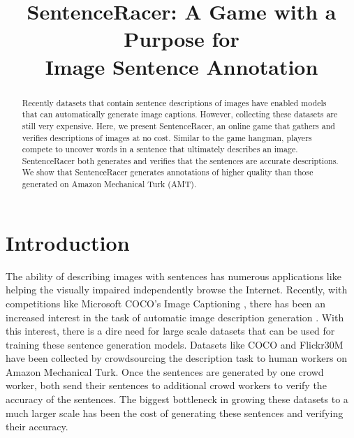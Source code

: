 \documentclass[preprint]{sigchi}
\begin{document}
\title{SentenceRacer: A Game with a Purpose for \\ Image Sentence Annotation}

\author{
}

\maketitle
\begin{abstract}
Recently datasets that contain sentence descriptions of images have enabled models that can automatically generate image captions. However, collecting these datasets are still very expensive. Here, we present SentenceRacer, an online game that gathers and verifies descriptions of images at no cost. Similar to the game hangman, players compete to uncover words in a sentence that ultimately describes an image. SentenceRacer both generates and verifies that the sentences are accurate descriptions. We show that SentenceRacer generates annotations of higher quality than those generated on Amazon Mechanical Turk (AMT). \end{abstract}








\section{Introduction}
The ability of describing images with sentences has numerous applications like helping the visually impaired independently browse the Internet. Recently, with competitions like Microsoft COCO's Image Captioning \cite{coco}, there has been an increased interest in the task of automatic image description generation \cite{google}. With this interest, there is a dire need for large scale datasets that can be used for training these sentence generation models. Datasets like COCO \cite{coco} and Flickr30M \cite{flickr} have been collected by crowdsourcing the description task to human workers on Amazon Mechanical Turk. Once the sentences are generated by one crowd worker, both \cite{coco, flickr} send their sentences to additional crowd workers to verify the accuracy of the sentences. The biggest bottleneck in growing these datasets to a much larger scale has been the cost of generating these sentences and verifying their accuracy. 
\end{document}
